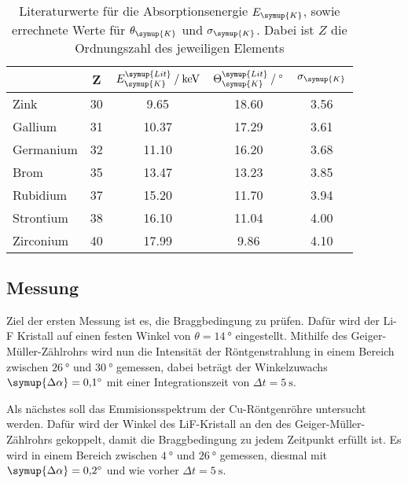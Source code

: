 \begin{table} [H]
    \centering
    \caption{Literaturwerte für die Absorptionsenergie $E_{\symup{K}}$, sowie errechnete Werte für
            $\theta_{\symup{K}}$ und $\sigma_{\symup{K}}$. Dabei ist $Z$ die Ordnungszahl des jeweiligen Elements \cite{Ekabs}}
    \label{tab:theoriewerte}
    \begin{tabular}{l c S S S}
        \toprule
         & Z & {$E_{\symup{K}}^{\symup{Lit}} \mathbin{/} \unit{\kilo\electronvolt}$} & 
         {$\Theta_{\symup{K}}^{\symup{Lit}} \mathbin{/} \unit{\degree}$} & {$\sigma_{\symup{K}}$} \\
        \midrule
        Zink         & 30 &  9.65 & 18.60 & 3.56 \\
        Gallium      & 31 & 10.37 & 17.29 & 3.61 \\
        Germanium    & 32 & 11.10 & 16.20 & 3.68 \\
        Brom         & 35 & 13.47 & 13.23 & 3.85 \\
        Rubidium     & 37 & 15.20 & 11.70 & 3.94 \\
        Strontium    & 38 & 16.10 & 11.04 & 4.00 \\
        Zirconium    & 40 & 17.99 &  9.86 & 4.10 \\
    \bottomrule
    \end{tabular}
\end{table}

\subsection{Messung}

Ziel der ersten Messung ist es, die Braggbedingung zu prüfen. Dafür wird der Li-F Kristall auf einen festen Winkel
von $\theta=\qty{14}{\degree}$ eingestellt. Mithilfe des Geiger-Müller-Zählrohrs wird nun die Intensität der Röntgenstrahlung
in einem Bereich zwischen $\qty{26}{\degree}$ und $\qty{30}{\degree}$ gemessen, dabei beträgt der Winkelzuwachs
$\symup{\Delta\alpha}=\qty{0.1}{\degree}$ mit einer Integrationszeit von $\Delta t=\qty{5}{\second}$.

Als nächstes soll das Emmisionsspektrum der Cu-Röntgenröhre untersucht werden. Dafür wird der Winkel des LiF-Kristall an den des
Geiger-Müller-Zählrohrs gekoppelt, damit die Braggbedingung zu jedem Zeitpunkt erfüllt ist.
Es wird in einem Bereich zwischen $\qty{4}{\degree}$ und $\qty{26}{\degree}$ gemessen, diesmal mit
$\symup{\Delta\alpha}=\qty{0.2}{\degree}$ und wie vorher $\Delta t=\qty{5}{\second}$.

